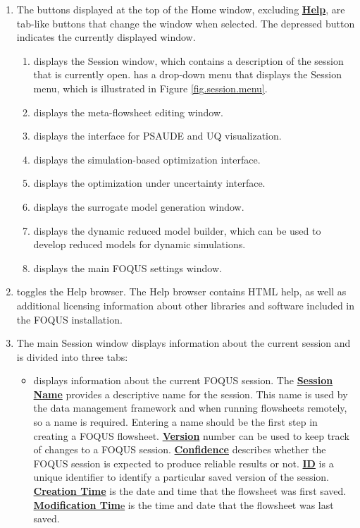 \begin{enumerate}
	\item The buttons displayed at the top of the Home window, excluding \textbf{\underline{Help}}, are tab-like buttons that change the window when selected. The depressed button indicates the currently displayed window.
	\begin{enumerate}
		\item {} displays the Session window, which contains a description of the session that is currently open.  has a drop-down menu that displays the Session menu, which is illustrated in Figure \ref{fig.session.menu}.
		\item {} displays the meta-flowsheet editing window.  
		\item {} displays the interface for PSAUDE and UQ visualization.
		\item {} displays the simulation-based optimization interface.
		\item {} displays the optimization under uncertainty interface.
		\item {} displays the surrogate model generation window.
		\item {} displays the dynamic reduced model builder, which can be used to develop reduced models for dynamic simulations.
		\item {} displays the main FOQUS settings window.
	\end{enumerate}
	\item {} toggles the Help browser. The Help browser contains HTML help, as well as additional licensing information about other libraries and software included in the FOQUS installation.
	\item The main Session window displays information about the current session and is divided into three tabs:
	\begin{itemize}
		\item {} displays information about the current FOQUS session. The \underline{\textbf{Session Name}} provides a descriptive name for the session. This name is used by the data management framework and when running flowsheets remotely, so a name is required. Entering a name should be the first step in creating a FOQUS flowsheet. \underline{\textbf{Version}} number can be used to keep track of changes to a FOQUS session. \underline{\textbf{Confidence}} describes whether the FOQUS session is expected to produce reliable results or not. \underline{\textbf{ID}} is a unique identifier to identify a particular saved version of the session. \underline{\textbf{Creation Time}} is the date and time that the flowsheet was first saved. \underline{\textbf{Modification Tim}e} is the time and date that the flowsheet was last saved. 

\end{itemize}
\end{enumerate}
